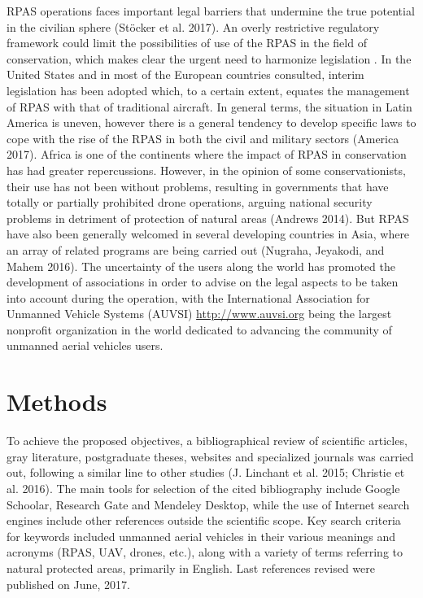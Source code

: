 \documentclass[]{interact}
\theoremstyle{plain}%
\theoremstyle{definition}
\theoremstyle{remark}
\begin{document}
RPAS operations faces important legal barriers that undermine the true
potential in the civilian sphere (Stöcker et al. 2017). An overly
restrictive regulatory framework could limit the possibilities of use of
the RPAS in the field of conservation, which makes clear the urgent need
to harmonize legislation . In the United States and in most of the
European countries consulted, interim legislation has been adopted
which, to a certain extent, equates the management of RPAS with that of
traditional aircraft. In general terms, the situation in Latin America
is uneven, however there is a general tendency to develop specific laws
to cope with the rise of the RPAS in both the civil and military sectors
(America 2017). Africa is one of the continents where the impact of RPAS
in conservation has had greater repercussions. However, in the opinion
of some conservationists, their use has not been without problems,
resulting in governments that have totally or partially prohibited drone
operations, arguing national security problems in detriment of
protection of natural areas (Andrews 2014). But RPAS have also been
generally welcomed in several developing countries in Asia, where an
array of related programs are being carried out (Nugraha, Jeyakodi, and
Mahem 2016). The uncertainty of the users along the world has promoted
the development of associations in order to advise on the legal aspects
to be taken into account during the operation, with the International
Association for Unmanned Vehicle Systems (AUVSI)
\url{http://www.auvsi.org} being the largest nonprofit organization in
the world dedicated to advancing the community of unmanned aerial
vehicles users.

\section{Methods}\label{methods}

To achieve the proposed objectives, a bibliographical review of
scientific articles, gray literature, postgraduate theses, websites and
specialized journals was carried out, following a similar line to other
studies (J. Linchant et al. 2015; Christie et al. 2016). The main tools
for selection of the cited bibliography include Google Schoolar,
Research Gate and Mendeley Desktop, while the use of Internet search
engines include other references outside the scientific scope. Key
search criteria for keywords included unmanned aerial vehicles in their
various meanings and acronyms (RPAS, UAV, drones, etc.), along with a
variety of terms referring to natural protected areas, primarily in
English. Last references revised were published on June, 2017.
\end{document}
